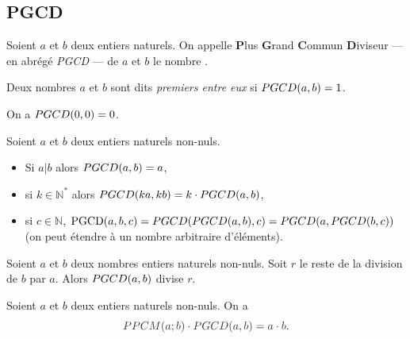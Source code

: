       \subsection{PGCD}
      \begin{defi}
      Soient $a$ et $b$ deux entiers naturels.
      On appelle \textbf{P}lus \textbf{G}rand \textbf{C}ommun \textbf{D}iviseur
      --- en abr\'eg\'e \emph{PGCD} --- de $a$ et $b$ le nombre 
            .
      
      
      Deux nombres $a$ et $b$ sont dits \emph{premiers entre eux} si $PGCD(a,b) = 1$.
      \end{defi}
      \begin{rmk}
            On a $PGCD(0,0)=0$.
      \end{rmk}
      \begin{prop}
            Soient $a$ et $b$ deux entiers naturels non-nuls.
            \begin{itemize}
                  \item Si $a|b$ alors $PGCD(a,b) = a$,
                  \item si $k\in\mathbb{N}^*$ alors $PGCD(ka,kb) = k \cdot PGCD(a,b)$,
                  \item si $c\in\mathbb{N}$, $\mathrm{PGCD}(a,b,c) = PGCD(PGCD(a,b),c) = PGCD(a,PGCD(b,c))$
                        (on peut \'etendre \`a un nombre arbitraire d'\'el\'ements).
            \end{itemize}
      \end{prop}
      \begin{thm}
            Soient $a$ et $b$ deux nombres entiers naturels non-nuls.
            Soit $r$ le reste de la division de $b$ par $a$.
            Alors $PGCD(a,b)$ divise $r$.
            
      \end{thm}
      \begin{thm}
            Soient $a$ et $b$ deux entiers naturels non-nuls.
            On a
            \[
                  \thmbox{PPCM(a;b)\cdot\pgcd{a}{b}=a\cdot b}.
            \]
      \end{thm}

